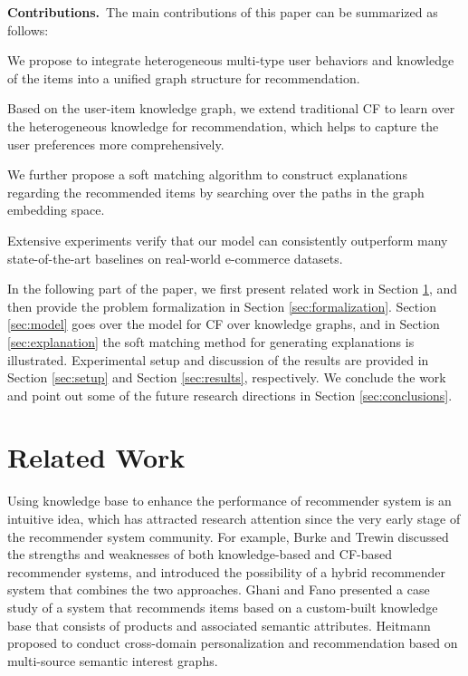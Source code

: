 \documentclass[algorithms,article,accept,moreauthors,pdftex,10pt,a4paper]{Definitions/mdpi}
\begin{document}
\noindent
\textbf{Contributions.}~The main contributions of this paper can be summarized as follows:

\vspace{6pt}  We propose to integrate heterogeneous multi-type user behaviors and knowledge of the items into a unified graph structure for recommendation.

 Based on the user-item knowledge graph, we extend traditional CF to learn over the heterogeneous knowledge for recommendation, which helps to capture the user preferences more comprehensively.

 We further propose a soft matching algorithm to construct explanations regarding the recommended items by searching over the paths in the graph embedding space.

 Extensive experiments verify that our model can consistently outperform many state-of-the-art baselines on real-world e-commerce datasets.

\vspace{6pt} In the following part of the paper, we first present related work in Section \ref{sec:related}, and then provide the problem formalization in Section \ref{sec:formalization}. Section \ref{sec:model} goes over the model for CF over knowledge graphs, and in Section \ref{sec:explanation} the soft matching method for generating explanations is illustrated. Experimental setup and discussion of the results are provided in Section \ref{sec:setup} and Section \ref{sec:results}, respectively. We conclude the work and point out some of the future research directions in Section \ref{sec:conclusions}.






\section{Related Work}\label{sec:related}

Using knowledge base to enhance the performance of recommender system is an intuitive idea, which has attracted research attention since the very early stage of the recommender system community. For example, Burke \cite{burke1999integrating} and Trewin \cite{burke2000knowledge} discussed the strengths and weaknesses of both knowledge-based and CF-based recommender systems, and introduced the possibility of a hybrid recommender system that combines the two approaches. Ghani and Fano \cite{ghani2002building} presented a case study of a system that recommends items based on a custom-built knowledge base that consists of products and associated semantic attributes. 
Heitmann \cite{heitmann2012open} proposed to conduct cross-domain personalization and recommendation based on multi-source semantic interest graphs.
\end{document}

